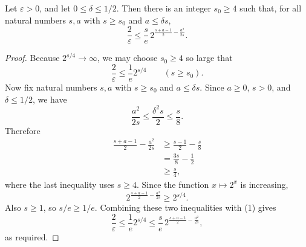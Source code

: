 \begin{helper}
Let \(\varepsilon>0\), and let \(0\le\delta\le1/2\).  Then there is an
integer \(s_0\ge4\) such that, for all natural numbers \(s,a\) with
\(s\ge s_0\) and \(a\le\delta s\),
\[
  \frac{2}{\varepsilon}
  \le
  \frac{s}{e}\,
  2^{\frac{s+a-1}{2}-\frac{a^2}{2s}}.
\]
\end{helper}
\begin{proof}
Because \(2^{s/4}\to\infty\), we may choose \(s_0\ge4\) so large that
\[
  \frac{2}{\varepsilon}
  \le
  \frac{1}{e}2^{s/4}
  \qquad(s\ge s_0). \tag{1}
\]
Now fix natural numbers \(s,a\) with \(s\ge s_0\) and \(a\le\delta s\).
Since \(a\ge0\), \(s>0\), and \(\delta\le1/2\), we have
\[
  \frac{a^2}{2s}\le\frac{\delta^2s}{2}\le\frac{s}{8}.
\]
Therefore
\[
\begin{aligned}
  \frac{s+a-1}{2}-\frac{a^2}{2s}
  &\ge \frac{s-1}{2}-\frac{s}{8}\\
  &=\frac{3s}{8}-\frac12\\
  &\ge \frac{s}{4},
\end{aligned}
\]
where the last inequality uses \(s\ge4\).  Since the function \(x\mapsto2^x\)
is increasing,
\[
  2^{\frac{s+a-1}{2}-\frac{a^2}{2s}}\ge 2^{s/4}.
\]
Also \(s\ge1\), so \(s/e\ge1/e\).  Combining these two inequalities with
(1) gives
\[
  \frac{2}{\varepsilon}
  \le
  \frac1e2^{s/4}
  \le
  \frac{s}{e}\,
  2^{\frac{s+a-1}{2}-\frac{a^2}{2s}},
\]
as required.
\end{proof}
